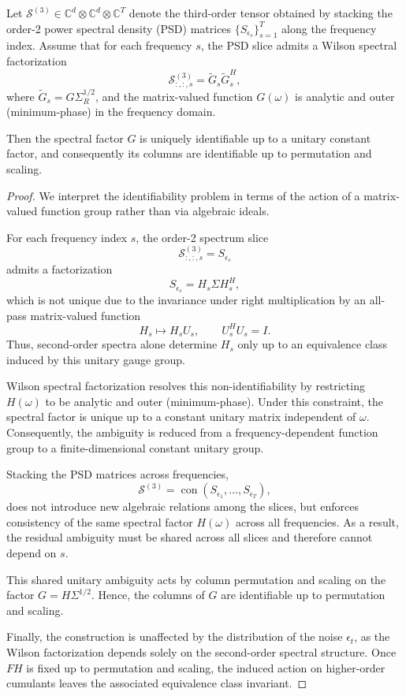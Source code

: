\documentclass[10pt,a4paper]{amsart}
\begin{document}
\begin{corollary}\label{Neural PSD}
Let $\mathcal{S}^{(3)} \in \mathbb{C}^{d} \otimes \mathbb{C}^{d} \otimes \mathbb{C}^{T}$ denote the third-order tensor obtained by stacking the order-2 power spectral density (PSD) matrices $\{S_{\epsilon_s}\}_{s=1}^T$ along the frequency index.
Assume that for each frequency $s$, the PSD slice admits a Wilson spectral factorization
\[
\mathcal{S}^{(3)}_{:,:,s}
=
\tilde G_s \tilde G_s^{H},
\]
where $\tilde G_s = G \Sigma_R^{1/2}$, and the matrix-valued function $G(\omega)$ is analytic and outer (minimum-phase) in the frequency domain.

Then the spectral factor $G$ is uniquely identifiable up to a unitary constant factor, and consequently its columns are identifiable up to permutation and scaling.
\end{corollary}

\begin{proof}
We interpret the identifiability problem in terms of the action of a matrix-valued function group rather than via algebraic ideals.

For each frequency index $s$, the order-2 spectrum slice
\[
\mathcal{S}^{(3)}_{:,:,s} = S_{\epsilon_s}
\]
admits a factorization
\[
S_{\epsilon_s} = H_s \Sigma H_s^H,
\]
which is not unique due to the invariance under right multiplication by an all-pass matrix-valued function
\[
H_s \mapsto H_s U_s,
\qquad U_s^H U_s = I.
\]
Thus, second-order spectra alone determine $H_s$ only up to an equivalence class induced by this unitary gauge group.

Wilson spectral factorization resolves this non-identifiability by restricting $H(\omega)$ to be analytic and outer (minimum-phase). Under this constraint, the spectral factor is unique up to a constant unitary matrix independent of $\omega$. Consequently, the ambiguity is reduced from a frequency-dependent function group to a finite-dimensional constant unitary group.

Stacking the PSD matrices across frequencies,
\[
\mathcal{S}^{(3)} = \operatorname{con}(S_{\epsilon_1}, \dots, S_{\epsilon_T}),
\]
does not introduce new algebraic relations among the slices, but enforces consistency of the same spectral factor $H(\omega)$ across all frequencies. As a result, the residual ambiguity must be shared across all slices and therefore cannot depend on $s$.

This shared unitary ambiguity acts by column permutation and scaling on the factor $G = H \Sigma^{1/2}$. Hence, the columns of $G$ are identifiable up to permutation and scaling.

Finally, the construction is unaffected by the distribution of the noise $\epsilon_t$, as the Wilson factorization depends solely on the second-order spectral structure. Once $FH$ is fixed up to permutation and scaling, the induced action on higher-order cumulants leaves the associated equivalence class invariant.
\end{proof}
\end{document}
